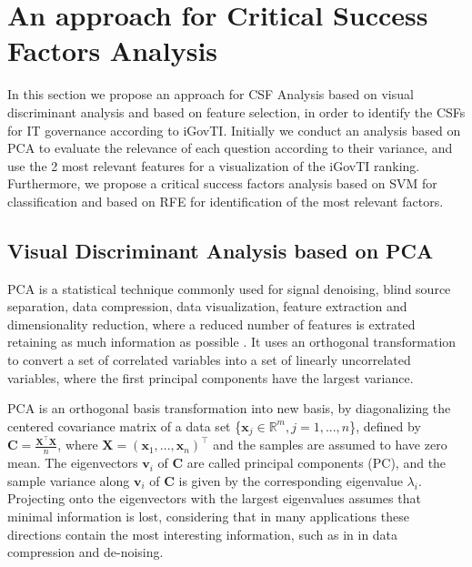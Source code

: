 \section{An approach for Critical Success Factors Analysis}
\label{sec:ch2_csf_fs}

In this section we propose an approach for CSF Analysis based on visual discriminant analysis and based on feature selection, in order to identify the CSFs for IT governance according to iGovTI. Initially we conduct an analysis based on PCA to evaluate the relevance of each question according to their variance, and use the 2 most relevant features for a visualization of the iGovTI ranking. Furthermore, we propose a critical success factors analysis based on SVM for classification and based on RFE for identification of the most relevant factors.

\subsection{Visual Discriminant Analysis based on PCA}
\label{sec:ch2_pca}

PCA is a statistical technique commonly used for signal denoising, blind source separation, data compression, data visualization, feature extraction and dimensionality reduction, where a reduced number of features is extrated retaining as much information as possible \cite{jolliffe1986principal}. It uses an orthogonal transformation to convert a set of correlated variables into a set of linearly uncorrelated variables, where the first principal components have the largest variance.

PCA is an orthogonal basis transformation into new basis, by diagonalizing the centered covariance matrix of a data set \{$\mathbf{x}_j \in \mathbb{R}^m, j = 1, ... ,n$\}, defined by $\mathbf{C} = \frac{\mathbf{X}^\intercal\mathbf{X}}{n}$, where $\mathbf{X} = (\mathbf{x}_1, ... , \mathbf{x}_n)^\intercal$ and the samples are assumed to have zero mean. The eigenvectors $\mathbf{v}_i$ of $\mathbf{C}$ are called principal components (PC), and the sample variance along $\mathbf{v}_i$ of $\mathbf{C}$ is given by the corresponding eigenvalue $\lambda_i$. Projecting onto the eigenvectors with the largest eigenvalues assumes that minimal information is lost, considering that in many applications these directions contain the most interesting information, such as in in data compression and de-noising.


